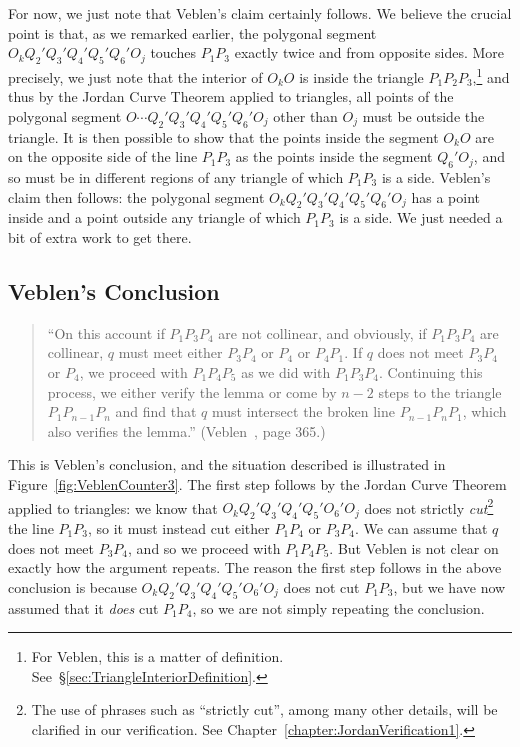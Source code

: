 For now, we just note that Veblen's claim certainly follows. We believe the crucial point is that, as we remarked earlier, the polygonal segment $O_kQ_2'Q_3'Q_4'Q_5'Q_6'O_j$ touches $P_1P_3$ exactly twice and from opposite sides. More precisely, we just note that the interior of $O_kO$ is inside the triangle $P_1P_2P_3$,\footnote{For Veblen, this is a matter of definition. See~\S\ref{sec:TriangleInteriorDefinition}.} and thus by the Jordan Curve Theorem applied to triangles, all points of the polygonal segment $O\cdots Q_2'Q_3'Q_4'Q_5'Q_6'O_j$ other than $O_j$ must be outside the triangle. It is then possible to show that the points inside the segment $O_kO$ are on the opposite side of the line $P_1P_3$ as the points inside the segment $Q_6'O_j$, and so must be in different regions of any triangle of which $P_1P_3$ is a side. Veblen's claim then follows: the polygonal segment $O_kQ_2'Q_3'Q_4'Q_5'Q_6'O_j$ has a point inside and a point outside any triangle of which $P_1P_3$ is a side. We just needed a bit of extra work to get there.

\subsection{Veblen's Conclusion}
\begin{quote}
``On this account if $P_1P_3P_4$ are not collinear, and obviously, if $P_1P_3P_4$ are collinear, $q$ must meet either $P_3P_4$ or $P_4$ or $P_4P_1$. If $q$ does not meet $P_3P_4$ or $P_4$, we proceed with $P_1P_4P_5$ as we did with $P_1P_3P_4$. Continuing this process, we either verify the lemma or come by $n-2$ steps to the triangle $P_1P_{n-1}P_n$ and find that $q$ must intersect the broken line $P_{n-1}P_nP_1$, which also verifies the lemma.'' (Veblen~\cite{Veblenphd}, page 365.)
\end{quote}

This is Veblen's conclusion, and the situation described is illustrated in Figure~\ref{fig:VeblenCounter3}. The first step follows by the Jordan Curve Theorem applied to triangles: we know that $O_kQ_2'Q_3'Q_4'Q_5'O_6'O_j$ does not strictly \emph{cut}\footnote{The use of phrases such as ``strictly cut'', among many other details, will be clarified in our verification. See Chapter~\ref{chapter:JordanVerification1}.} the line $P_1P_3$, so it must instead cut either $P_1P_4$ or $P_3P_4$. We can assume that $q$ does not meet $P_3P_4$, and so we proceed with $P_1P_4P_5$. But Veblen is not clear on exactly how the argument repeats. The reason the first step follows in the above conclusion is because $O_kQ_2'Q_3'Q_4'Q_5'O_6'O_j$ does not cut $P_1P_3$, but we have now assumed that it \emph{does} cut $P_1P_4$, so we are not simply repeating the conclusion. 

